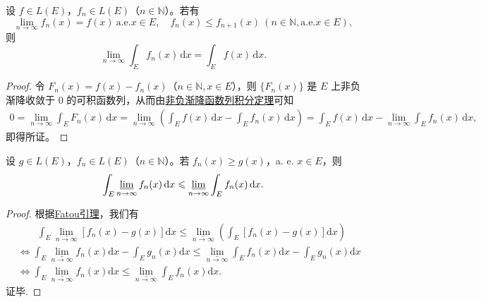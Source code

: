 \documentclass[../../main.tex]{subfiles}%
\begin{document}
\begin{theorem}\label{theorem:递增可测函数列的积分和极限可交换}
设 $f \in L(E)$，$f_n \in L(E)$（$n \in \mathbb{N}$）。若有
\[
\lim_{n \to \infty} f_n(x) = f(x) \ \text{a.e.} x \in E, \quad f_n(x) \leqslant f_{n + 1}(x) \ (n \in \mathbb{N}, \text{a.e.} x \in E),
\]
则
\[
\lim_{n \to \infty} \int_E f_n(x) \, \mathrm{d}x = \int_E f(x) \, \mathrm{d}x.
\]
\end{theorem}
\begin{proof} 
令 $F_n(x) = f(x) - f_n(x)$（$n \in \mathbb{N}, x \in E$），则 $\{ F_n(x) \}$ 是 $E$ 上非负渐降收敛于 $0$ 的可积函数列，从而由\hyperref[corollary:非负渐降函数列积分定理]{非负渐降函数列积分定理}可知
\begin{align*}
0 = \lim_{n \to \infty} \int_E F_n(x) \, \mathrm{d}x 
= \lim_{n \to \infty} \left( \int_E f(x) \, \mathrm{d}x - \int_E f_n(x) \, \mathrm{d}x \right) 
= \int_E f(x) \, \mathrm{d}x - \lim_{n \to \infty} \int_E f_n(x) \, \mathrm{d}x,
\end{align*}
即得所证。
\end{proof}

\begin{proposition}
设 $g \in L(E)$，$f_n \in L(E)$（$n \in \mathbb{N}$）。若 $f_n(x) \geqslant g(x)$，a. e. $x \in E$，则
\[
\int_E \varliminf_{n \to \infty} f_n(x) \, \mathrm{d}x \leqslant \varliminf_{n \to \infty} \int_E f_n(x) \, \mathrm{d}x.
\]
\end{proposition}
\begin{proof}
根据\hyperref[theorem:Fatou引理]{Fatou引理}，我们有
\begin{align*}
&\quad \quad \int_E{\underset{n\rightarrow \infty}{\underline{\lim }}\left[ f_n\left( x \right) -g\left( x \right) \right] \mathrm{d}x}\leqslant \underset{n\rightarrow \infty}{\underline{\lim }}\left( \int_E{\left[ f_n\left( x \right) -g\left( x \right) \right] \mathrm{d}x} \right) 
\\
&\Longleftrightarrow \int_E{\underset{n\rightarrow \infty}{\underline{\lim }}f_n\left( x \right) \mathrm{d}x}-\int_E{g_n\left( x \right) \mathrm{d}x}\leqslant \underset{n\rightarrow \infty}{\underline{\lim }}\int_E{f_n\left( x \right) \mathrm{d}x}-\int_E{g_n\left( x \right) \mathrm{d}x}
\\
&\Longleftrightarrow \int_E{\underset{n\rightarrow \infty}{\underline{\lim }}f_n\left( x \right) \mathrm{d}x}\leqslant \underset{n\rightarrow \infty}{\underline{\lim }}\int_E{f_n\left( x \right) \mathrm{d}x}.
\end{align*}
证毕.
\end{proof}
\end{document}
